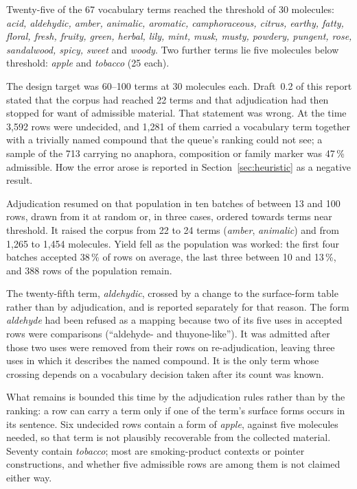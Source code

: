 \documentclass[
  computerscience
]{genesisl1-paper}
\begin{document}
Twenty-five of the 67 vocabulary terms reached the threshold of 30 molecules:
\emph{acid, aldehydic, amber, animalic, aromatic, camphoraceous, citrus, earthy, fatty,
floral, fresh, fruity, green, herbal, lily, mint, musk, musty, powdery, pungent, rose,
sandalwood, spicy, sweet} and \emph{woody}. Two further terms lie five molecules below
threshold: \emph{apple} and \emph{tobacco} (25 each).

The design target was 60--100 terms at 30 molecules each. Draft~0.2 of this report
stated that the corpus had reached 22 terms and that adjudication had then stopped for
want of admissible material. That statement was wrong. At the time 3{,}592 rows were
undecided, and 1{,}281 of them carried a vocabulary term together with a trivially named
compound that the queue's ranking could not see; a sample of the 713 carrying no
anaphora, composition or family marker was 47\,\% admissible. How the error arose is reported in Section~\ref{sec:heuristic} as a negative
result.

Adjudication resumed on that population in ten batches of between 13 and 100 rows, drawn
from it at random or, in three cases, ordered towards terms near threshold.
It raised the corpus from 22 to 24 terms (\emph{amber}, \emph{animalic}) and from
1{,}265 to 1{,}454 molecules. Yield fell as the population was worked: the first four
batches accepted 38\,\% of rows on average, the last three between 10 and 13\,\%, and 388
rows of the population remain.

The twenty-fifth term, \emph{aldehydic}, crossed by a change to the surface-form table
rather than by adjudication, and is reported separately for that reason. The form
\emph{aldehyde} had been refused as a mapping because two of its five uses in accepted
rows were comparisons (``aldehyde- and thuyone-like''). It was admitted after those two
uses were removed from their rows on re-adjudication, leaving three uses in which it
describes the named compound. It is the only term whose crossing depends on a vocabulary
decision taken after its count was known.

What remains is bounded this time by the adjudication rules rather than by the ranking:
a row can carry a term only if one of the term's surface forms occurs in its sentence.
Six undecided rows contain a form of \emph{apple}, against five molecules needed, so that
term is not plausibly recoverable from the collected material. Seventy contain
\emph{tobacco}; most are smoking-product contexts or pointer constructions, and whether
five admissible rows are among them is not claimed either way.
\end{document}
